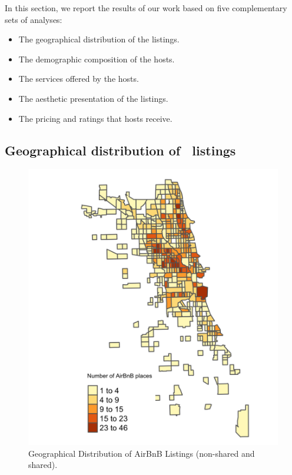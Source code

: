
In this section, we report the results of our work based on five complementary sets of analyses: 

\begin{itemize}
\item The geographical distribution of the listings.
\item The demographic composition of the hosts.
\item The services offered by the hosts.
\item The aesthetic presentation of the listings.
\item The pricing and ratings that hosts receive.
\end{itemize}


\subsection{Geographical distribution of \ab \ listings }

\begin{figure}[!h]
\begin{center}
\includegraphics[scale=0.20]{pics/listings.png}
\caption{Geographical Distribution of AirBnB Listings (non-shared and shared).}
\label{fig:alllistings}
\end{center}
\end{figure}

